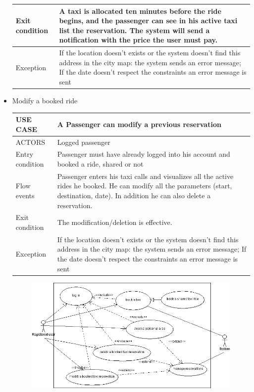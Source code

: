 \begin{itemize}
\begin{center}
\begin{tabular}{ | l | p{11cm} |}
  	   Exit condition & A taxi is allocated ten minutes before the ride begins, and the passenger can see in his active taxi list the reservation.
The system will send a notification with the price the user must pay.\\ \hline
  	   Exception &  If the location doesn’t exists or the system doesn’t find this address in the city map: the system sends an error message;
If the date doesn’t respect the constraints an error message is sent\\ \hline
    \end{tabular}
	\end{center}
\item Modify a booked ride
	\begin{center}
   	 \begin{tabular}{ | l | p{11cm} |}
   	 \hline
   	USE CASE & A Passenger can modify a previous reservation\\ \hline
   	 ACTORS & Logged passenger \\ \hline
    	 Entry condition & Passenger must have already logged into his account and booked a ride, shared or not\\ \hline
    	 Flow events & Passenger enters his taxi calls and visualizes all the active rides he booked. He can modify all the parameters (start, destination, date).
In addition he can also delete a reservation.\\ \hline
  	   Exit condition & The modification/deletion is effective.\\ \hline
  	   Exception &  If the location doesn’t exists or the system doesn’t find this address in the city map: the system sends an error message;
If the date doesn’t respect the constraints an error message is sent\\ \hline
    \end{tabular}
	\end{center}
	
  \begin{figure} [h]
  \centering
  \includegraphics [scale=0.5]{bookataxi.png}
  \end{figure}
	

\end{itemize}
